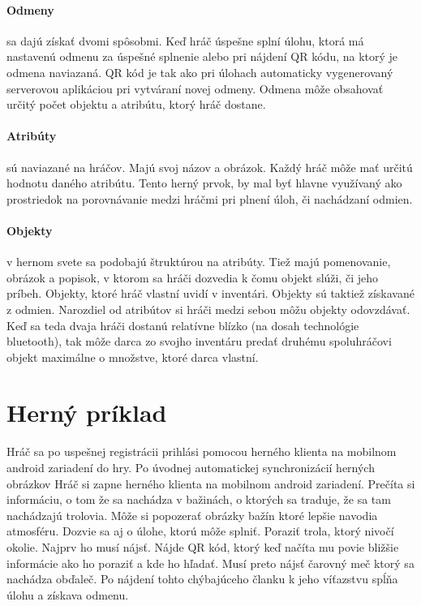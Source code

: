 \paragraph{Odmeny} sa dajú získať dvomi spôsobmi. Keď hráč úspešne splní úlohu, ktorá má nastavenú odmenu za úspešné splnenie alebo pri nájdení QR kódu, na ktorý je odmena naviazaná. QR kód je tak ako pri úlohach automaticky vygenerovaný serverovou aplikáciou pri vytváraní novej odmeny. Odmena môže obsahovať určitý počet objektu a atribútu, ktorý hráč dostane.

\paragraph{Atribúty} sú naviazané na hráčov. Majú svoj názov a obrázok. Každý hráč môže mať určitú hodnotu daného atribútu. Tento herný prvok, by mal byť hlavne využívaný ako prostriedok na porovnávanie medzi hráčmi pri plnení úloh, či nachádzaní odmien. 

\paragraph{Objekty} v hernom svete sa podobajú štruktúrou na atribúty. Tiež majú pomenovanie, obrázok a popisok, v ktorom sa hráči dozvedia k čomu objekt slúži, či jeho príbeh. Objekty, ktoré hráč vlastní uvidí v inventári. Objekty sú taktiež získavané z odmien. Narozdiel od atribútov si hráči medzi sebou môžu objekty odovzdávať. Keď sa teda dvaja hráči dostanú relatívne blízko (na dosah technológie bluetooth), tak môže darca zo svojho inventáru predať druhému spoluhráčovi objekt maximálne o množstve, ktoré darca vlastní.

\section{Herný príklad}
Hráč sa po uspešnej registrácii prihlási pomocou herného klienta na mobilnom android zariadení do hry. Po úvodnej automatickej synchronizácií herných obrázkov 
Hráč si zapne herného klienta na mobilnom android zariadení. Prečíta si informáciu, o tom že sa nachádza v bažinách, o ktorých sa traduje, že sa tam nachádzajú trolovia. Môže si popozerať obrázky bažín ktoré lepšie navodia atmosféru. Dozvie sa aj o úlohe, ktorú môže splniť. Poraziť trola, ktorý nivočí okolie. Najprv ho musí nájsť. Nájde QR kód, ktorý keď načíta mu povie bližšie informácie ako ho poraziť a kde ho hľadať. Musí preto nájsť čarovný meč ktorý sa nachádza obďaleč. Po nájdení tohto chýbajúceho članku k jeho víťazstvu spĺňa úlohu a získava odmenu.
